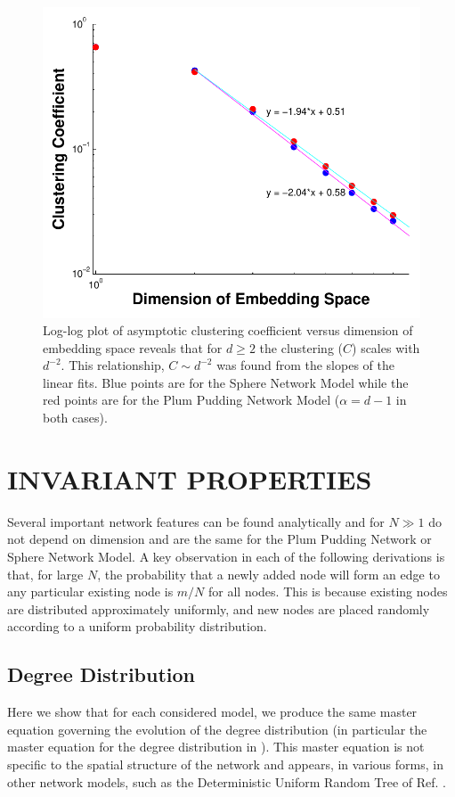 \documentclass[aps,pre,manuscript,superscriptaddress,amsmath,amssymb,nofootinbib]{revtex4-1}
\begin{document}
\begin{figure}
\includegraphics[width=\linewidth]{figures/figCvsD.pdf}
\caption{\label{clustdim}Log-log plot of asymptotic clustering coefficient versus dimension of embedding space reveals that for $d \geq 2$ the clustering ($C$) scales with $d^{-2}$. This relationship, $C \sim d^{-2}$ was found from the slopes of the linear fits. Blue points are for the Sphere Network Model while the red points are for the Plum Pudding Network Model ($\alpha = d-1$ in both cases).}
\end{figure}

\section{INVARIANT PROPERTIES}
Several important network features can be found analytically and for $N \gg 1$ do not depend on dimension and are the same for the Plum Pudding Network or Sphere Network Model.
A key observation in each of the following derivations is that, for large $N$, the probability that a newly added node will form an edge to any particular existing node is $m/N$ for all nodes.
This is because existing nodes are distributed approximately uniformly, and new nodes are placed randomly according to a uniform probability distribution.

\subsection{Degree Distribution}
\label{sub:degreedistribution}
Here we show that for each considered model, we produce the same master equation governing the evolution of the degree distribution (in particular the master equation for the degree distribution in \cite{ozik2004}).  
This master equation is not specific to the spatial structure of the network and appears, in various forms, in other network models, such as the Deterministic Uniform Random Tree of Ref. \cite{zhang2008topologies}.
\end{document}
